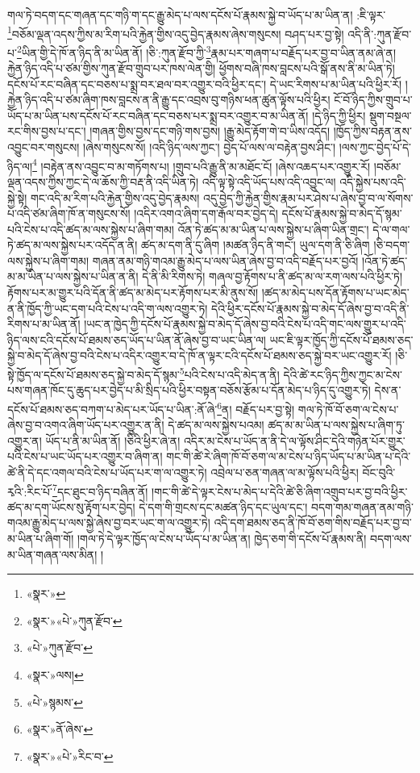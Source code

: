གལ་ཏེ་བདག་དང་གཞན་དང་གཉི་ག་དང་རྒྱུ་མེད་པ་ལས་དངོས་པོ་རྣམས་སྐྱེ་བ་ཡོད་པ་མ་ཡིན་ན། :ཇི་ལྟར་\footnote{«སྣར་»}བཅོམ་ལྡན་འདས་ཀྱིས་མ་རིག་པའི་རྐྱེན་གྱིས་འདུ་བྱེད་རྣམས་ཞེས་གསུངས། བཤད་པར་བྱ་སྟེ། འདི་ནི་:ཀུན་རྫོབ་པ་\footnote{«སྣར་»«པེ་»ཀུན་རྫོབ་}ཡིན་གྱི་དེ་ཁོ་ན་ཉིད་ནི་མ་ཡིན་ནོ། །ཅི་:ཀུན་རྫོབ་ཀྱི་\footnote{«པེ་»ཀུན་རྫོབ་}རྣམ་པར་གཞག་པ་བརྗོད་པར་བྱ་བ་ཡིན་ནམ་ཞེ་ན། རྐྱེན་ཉིད་འདི་པ་ཙམ་གྱིས་ཀུན་རྫོབ་གྲུབ་པར་ཁས་ལེན་གྱི། ཕྱོགས་བཞི་ཁས་བླངས་པའི་སྒོ་ནས་ནི་མ་ཡིན་ཏེ། དངོས་པོ་རང་བཞིན་དང་བཅས་པ་སྨྲ་བར་ཐལ་བར་འགྱུར་བའི་ཕྱིར་དང་། དེ་ཡང་རིགས་པ་མ་ཡིན་པའི་ཕྱིར་རོ། །རྐྱེན་ཉིད་འདི་པ་ཙམ་ཞིག་ཁས་བླངས་ན་ནི་རྒྱུ་དང་འབྲས་བུ་གཉིས་ཕན་ཚུན་ལྟོས་པའི་ཕྱིར། ངོ་བོ་ཉིད་ཀྱིས་གྲུབ་པ་ཡོད་པ་མ་ཡིན་པས་དངོས་པོ་རང་བཞིན་དང་བཅས་པར་སྨྲ་བར་འགྱུར་བ་མ་ཡིན་ནོ། །དེ་ཉིད་ཀྱི་ཕྱིར། སྡུག་བསྔལ་རང་གིས་བྱས་པ་དང་། །གཞན་གྱིས་བྱས་དང་གཉི་གས་བྱས། །རྒྱུ་མེད་རྟོག་གེ་བ་ཡིས་འདོད། །ཁྱོད་ཀྱིས་བརྟན་ནས་འབྱུང་བར་གསུངས། །ཞེས་གསུངས་སོ། །འདི་ཉིད་ལས་ཀྱང་། བྱེད་པོ་ལས་ལ་བརྟེན་བྱས་ཤིང་། །ལས་ཀྱང་བྱེད་པོ་དེ་ཉིད་ལ།\footnote{«སྣར་»ལས།} །བརྟེན་ནས་འབྱུང་བ་མ་གཏོགས་པ། །གྲུབ་པའི་རྒྱུ་ནི་མ་མཐོང་ངོ། །ཞེས་འཆད་པར་འགྱུར་རོ། །བཅོམ་ལྡན་འདས་ཀྱིས་ཀྱང་དེ་ལ་ཆོས་ཀྱི་བརྡ་ནི་འདི་ཡིན་ཏེ། འདི་ལྟ་སྟེ་འདི་ཡོད་པས་འདི་འབྱུང་ལ། འདི་སྐྱེས་པས་འདི་སྐྱེ་སྟེ། གང་འདི་མ་རིག་པའི་རྐྱེན་གྱིས་འདུ་བྱེད་རྣམས། འདུ་བྱེད་ཀྱི་རྐྱེན་གྱིས་རྣམ་པར་ཤེས་པ་ཞེས་བྱ་བ་ལ་སོགས་པ་འདི་ཙམ་ཞིག་ཁོ་ན་གསུངས་སོ། །འདིར་འགའ་ཞིག་དག་རྒོལ་བར་བྱེད་དེ། དངོས་པོ་རྣམས་སྐྱེ་བ་མེད་དོ་སྙམ་པའི་ངེས་པ་འདི་ཚད་མ་ལས་སྐྱེས་པ་ཞིག་གམ། འོན་ཏེ་ཚད་མ་མ་ཡིན་པ་ལས་སྐྱེས་པ་ཞིག་ཡིན་གྲང་། དེ་ལ་གལ་ཏེ་ཚད་མ་ལས་སྐྱེས་པར་འདོད་ན་ནི། ཚད་མ་དག་ནི་དུ་ཞིག །མཚན་ཉིད་ནི་གང་། ཡུལ་དག་ནི་ཅི་ཞིག །ཅི་བདག་ལས་སྐྱེས་པ་ཞིག་གམ། གཞན་ནམ་གཉི་གའམ་རྒྱུ་མེད་པ་ལས་ཡིན་ཞེས་བྱ་བ་འདི་བརྗོད་པར་བྱའོ། །འོན་ཏེ་ཚད་མ་མ་ཡིན་པ་ལས་སྐྱེས་པ་ཡིན་ན་ནི། དེ་ནི་མི་རིགས་ཏེ། གཞལ་བྱ་རྟོགས་པ་ནི་ཚད་མ་ལ་རག་ལས་པའི་ཕྱིར་ཏེ། རྟོགས་པར་མ་གྱུར་པའི་དོན་ནི་ཚད་མ་མེད་པར་རྟོགས་པར་མི་ནུས་སོ། །ཚད་མ་མེད་པས་དོན་རྟོགས་པ་ཡང་མེད་ན་ནི་ཁྱོད་ཀྱི་ཡང་དག་པའི་ངེས་པ་འདི་ག་ལས་འགྱུར་ཏེ། དེའི་ཕྱིར་དངོས་པོ་རྣམས་སྐྱེ་བ་མེད་དོ་ཞེས་བྱ་བ་འདི་ནི་རིགས་པ་མ་ཡིན་ནོ། །ཡང་ན་ཁྱེད་ཀྱི་དངོས་པོ་རྣམས་སྐྱེ་བ་མེད་དོ་ཞེས་བྱ་བའི་ངེས་པ་འདི་གང་ལས་གྱུར་པ་འདི་ཉིད་ལས་ངའི་དངོས་པོ་ཐམས་ཅད་ཡོད་པ་ཡིན་ནོ་ཞེས་བྱ་བ་ཡང་ཡིན་ལ། ཡང་ཇི་ལྟར་ཁྱོད་ཀྱི་དངོས་པོ་ཐམས་ཅད་སྐྱེ་བ་མེད་དོ་ཞེས་བྱ་བའི་ངེས་པ་འདིར་འགྱུར་བ་དེ་ཁོ་ན་ལྟར་ངའི་དངོས་པོ་ཐམས་ཅད་སྐྱེ་བར་ཡང་འགྱུར་རོ། །ཅི་སྟེ་ཁྱོད་ལ་དངོས་པོ་ཐམས་ཅད་སྐྱེ་བ་མེད་དོ་སྙམ་\footnote{«པེ་»སྙམས་}པའི་ངེས་པ་འདི་མེད་ན་ནི། དེའི་ཚེ་རང་ཉིད་ཀྱིས་ཀྱང་མ་ངེས་པས་གཞན་ཁོང་དུ་ཆུད་པར་བྱེད་པ་མི་སྲིད་པའི་ཕྱིར་བསྟན་བཅོས་རྩོམ་པ་དོན་མེད་པ་ཉིད་དུ་འགྱུར་ཏེ། དེས་ན་དངོས་པོ་ཐམས་ཅད་བཀག་པ་མེད་པར་ཡོད་པ་ཡིན་:ནོ་ཞེ་\footnote{«སྣར་»ནོ་ཞེས་}ན། བརྗོད་པར་བྱ་སྟེ། གལ་ཏེ་ཁོ་བོ་ཅག་ལ་ངེས་པ་ཞེས་བྱ་བ་འགའ་ཞིག་ཡོད་པར་འགྱུར་ན་ནི། དེ་ཚད་མ་ལས་སྐྱེས་པའམ། ཚད་མ་མ་ཡིན་པ་ལས་སྐྱེས་པ་ཞིག་ཏུ་འགྱུར་ན། ཡོད་པ་ནི་མ་ཡིན་ནོ། །ཅིའི་ཕྱིར་ཞེ་ན། འདིར་མ་ངེས་པ་ཡོད་ན་ནི་དེ་ལ་ལྟོས་ཤིང་དེའི་གཉེན་པོར་གྱུར་པའི་ངེས་པ་ཡང་ཡོད་པར་འགྱུར་བ་ཞིག་ན། གང་གི་ཚེ་རེ་ཞིག་ཁོ་བོ་ཅག་ལ་མ་ངེས་པ་ཉིད་ཡོད་པ་མ་ཡིན་པ་དེའི་ཚེ་ནི་དེ་དང་འགལ་བའི་ངེས་པ་ཡོད་པར་ག་ལ་འགྱུར་ཏེ། འབྲེལ་པ་ཅན་གཞན་ལ་མ་ལྟོས་པའི་ཕྱིར། བོང་བུའི་རྭའི་:རིང་པོ་\footnote{«སྣར་»«པེ་»རིང་བ་}དང་ཐུང་བ་ཉིད་བཞིན་ནོ། །གང་གི་ཚེ་དེ་ལྟར་ངེས་པ་མེད་པ་དེའི་ཚེ་ཅི་ཞིག་འགྲུབ་པར་བྱ་བའི་ཕྱིར་ཚད་མ་དག་ཡོངས་སུ་རྟོག་པར་བྱེད། དེ་དག་གི་གྲངས་དང་མཚན་ཉིད་དང་ཡུལ་དང་། བདག་གམ་གཞན་ནམ་གཉི་གའམ་རྒྱུ་མེད་པ་ལས་སྐྱེ་ཞེས་བྱ་བར་ཡང་ག་ལ་འགྱུར་ཏེ། འདི་དག་ཐམས་ཅད་ནི་ཁོ་བོ་ཅག་གིས་བརྗོད་པར་བྱ་བ་མ་ཡིན་པ་ཞིག་གོ། །གལ་ཏེ་དེ་ལྟར་ཁྱོད་ལ་ངེས་པ་ཡོད་པ་མ་ཡིན་ན། ཁྱེད་ཅག་གི་དངོས་པོ་རྣམས་ནི། བདག་ལས་མ་ཡིན་གཞན་ལས་མིན། །
